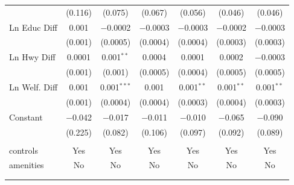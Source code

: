 \begin{table}[!htbp]
\begin{tabular}{@{\extracolsep{5pt}}lcccccc}
  & (0.116) & (0.075) & (0.067) & (0.056) & (0.046) & (0.046) \\ 
  Ln Educ Diff & 0.001 & $-$0.0002 & $-$0.0003 & $-$0.0003 & $-$0.0002 & $-$0.0003 \\ 
  & (0.001) & (0.0005) & (0.0004) & (0.0004) & (0.0003) & (0.0003) \\ 
  Ln Hwy Diff & 0.0001 & 0.001$^{**}$ & 0.0004 & 0.0001 & 0.0002 & $-$0.0003 \\ 
  & (0.001) & (0.001) & (0.0005) & (0.0004) & (0.0005) & (0.0005) \\ 
  Ln Welf. Diff & 0.001 & 0.001$^{***}$ & 0.001 & 0.001$^{**}$ & 0.001$^{**}$ & 0.001$^{**}$ \\ 
  & (0.001) & (0.0004) & (0.0004) & (0.0003) & (0.0004) & (0.0003) \\ 
  Constant & $-$0.042 & $-$0.017 & $-$0.011 & $-$0.010 & $-$0.065 & $-$0.090 \\ 
  & (0.225) & (0.082) & (0.106) & (0.097) & (0.092) & (0.089) \\ 
 \hline \\[-1.8ex] 
controls & Yes & Yes & Yes & Yes & Yes & Yes \\ 
amenities & No & No & No & No & No & No \\ 
\hline \\[-1.8ex] 
\hline 
\hline \\[-1.8ex] 
\end{tabular} 
\end{table} 
